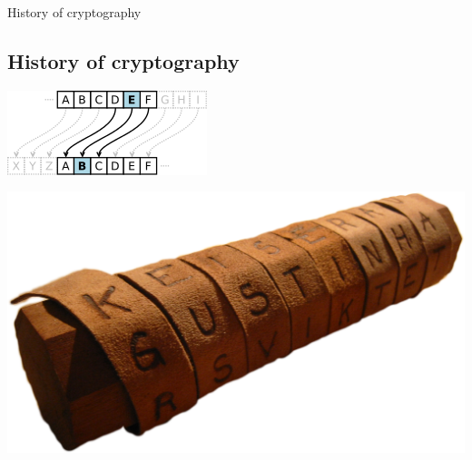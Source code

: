 \documentclass{beamer}
\begin{document}
\begin{frame}{History of cryptography}
    \subsection{History of cryptography}
    \begin{center}
        \begin{minipage}{0.48\linewidth}
        \includegraphics[width=\linewidth]{fig/Caesar_cipher_left_shift_of_3.svg.png}
        \end{minipage}
        
        \hfill
        
        \begin{minipage}{0.49\linewidth}
        \includegraphics[width=\linewidth]{fig/Skytale.png}
        \end{minipage}
        
    \end{center}
\end{frame}
\end{document}
